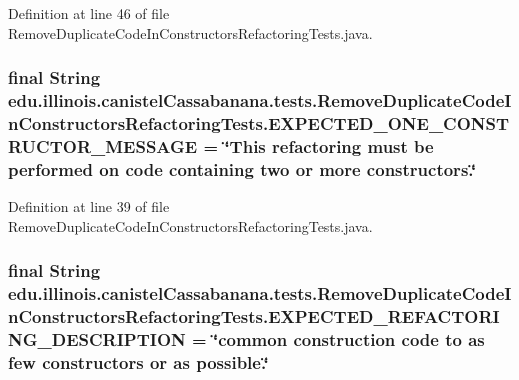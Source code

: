 Definition at line 46 of file RemoveDuplicateCodeInConstructorsRefactoringTests.java.

\hypertarget{classedu_1_1illinois_1_1canistelCassabanana_1_1tests_1_1RemoveDuplicateCodeInConstructorsRefactoringTests_a6d44de9379cb26439ffd7e2ff29e5874}{
\subsubsection[{EXPECTED\_\-ONE\_\-CONSTRUCTOR\_\-MESSAGE}]{\setlength{\rightskip}{0pt plus 5cm}final String {\bf edu.illinois.canistelCassabanana.tests.RemoveDuplicateCodeInConstructorsRefactoringTests.EXPECTED\_\-ONE\_\-CONSTRUCTOR\_\-MESSAGE} = \char`\"{}This refactoring must be performed on code containing two or more constructors.\char`\"{}}}
\label{classedu_1_1illinois_1_1canistelCassabanana_1_1tests_1_1RemoveDuplicateCodeInConstructorsRefactoringTests_a6d44de9379cb26439ffd7e2ff29e5874}


Definition at line 39 of file RemoveDuplicateCodeInConstructorsRefactoringTests.java.

\hypertarget{classedu_1_1illinois_1_1canistelCassabanana_1_1tests_1_1RemoveDuplicateCodeInConstructorsRefactoringTests_a093baeba2e5e938d962b85eb72b91f41}{
\subsubsection[{EXPECTED\_\-REFACTORING\_\-DESCRIPTION}]{\setlength{\rightskip}{0pt plus 5cm}final String {\bf edu.illinois.canistelCassabanana.tests.RemoveDuplicateCodeInConstructorsRefactoringTests.EXPECTED\_\-REFACTORING\_\-DESCRIPTION} = \char`\"{}common construction code to as few constructors or as possible.\char`\"{}}}
\label{classedu_1_1illinois_1_1canistelCassabanana_1_1tests_1_1RemoveDuplicateCodeInConstructorsRefactoringTests_a093baeba2e5e938d962b85eb72b91f41}


